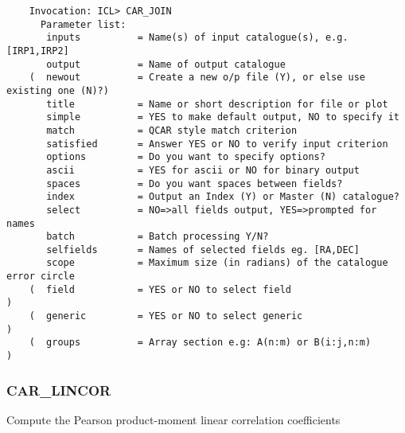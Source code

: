 \begin{verbatim}
    Invocation: ICL> CAR_JOIN
      Parameter list:
       inputs          = Name(s) of input catalogue(s), e.g. [IRP1,IRP2]
       output          = Name of output catalogue
    (  newout          = Create a new o/p file (Y), or else use existing one (N)?)
       title           = Name or short description for file or plot
       simple          = YES to make default output, NO to specify it
       match           = QCAR style match criterion
       satisfied       = Answer YES or NO to verify input criterion
       options         = Do you want to specify options?
       ascii           = YES for ascii or NO for binary output
       spaces          = Do you want spaces between fields?
       index           = Output an Index (Y) or Master (N) catalogue?
       select          = NO=>all fields output, YES=>prompted for names
       batch           = Batch processing Y/N?
       selfields       = Names of selected fields eg. [RA,DEC]
       scope           = Maximum size (in radians) of the catalogue error circle
    (  field           = YES or NO to select field                               )
    (  generic         = YES or NO to select generic                             )
    (  groups          = Array section e.g: A(n:m) or B(i:j,n:m)                 )
\end{verbatim}


\subsubsection{CAR\_LINCOR}

Compute the Pearson product-moment linear correlation coefficients

